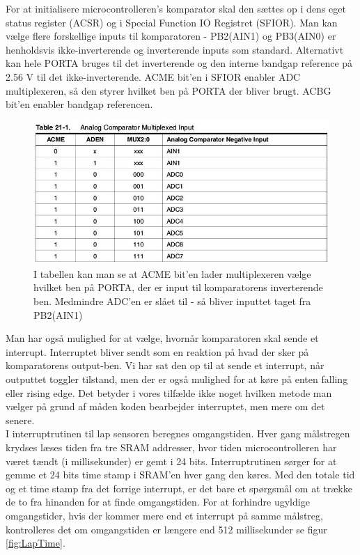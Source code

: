 For at initialisere microcontrolleren's komparator skal den sættes op i dens eget status register (ACSR) og i Special Function IO Registret (SFIOR). Man kan vælge flere forskellige inputs til komparatoren - PB2(AIN1) og PB3(AIN0) er henholdsvis ikke-inverterende og inverterende inputs som standard. Alternativt kan hele PORTA bruges til det inverterende og den interne bandgap reference på 2.56 V til det ikke-inverterende.  ACME bit'en i SFIOR enabler ADC multiplexeren, så den styrer hvilket ben på PORTA der bliver brugt. ACBG bit'en enabler bandgap referencen.

\begin{figure}[h]

	\centering
		\includegraphics[scale=0.3]{Billeder/Table21-1.jpg}
	\caption{I tabellen kan man se at ACME bit'en lader multiplexeren vælge hvilket ben på PORTA, der er input til komparatorens inverterende ben. Medmindre ADC'en er slået til - så bliver inputtet taget fra PB2(AIN1)}
	\label{fig:ACME}
	
\end{figure}

Man har også mulighed for at vælge, hvornår komparatoren skal sende et interrupt. Interruptet bliver sendt som en reaktion på hvad der sker på komparatorens output-ben. Vi har sat den op til at sende et interrupt, når outputtet toggler tilstand, men der er også mulighed for at køre på enten falling eller rising edge. Det betyder i vores tilfælde ikke noget hvilken metode man vælger på grund af måden koden bearbejder interruptet, men mere om det senere.\\

I interruptrutinen til lap sensoren beregnes omgangstiden. Hver gang målstregen krydses læses tiden fra tre SRAM addresser, hvor tiden microcontrolleren har været tændt (i millisekunder) er gemt i 24 bits. Interruptrutinen sørger for at gemme et 24 bits time stamp i SRAM'en hver gang den køres. Med den totale tid og et time stamp fra det forrige interrupt, er det bare et spørgsmål om at trække de to fra hinanden for at finde omgangstiden. For at forhindre ugyldige omgangstider, hvis der kommer mere end et interrupt på samme målstreg, kontrolleres det om omgangstiden er længere end 512 millisekunder se figur \ref{fig:LapTime}.

